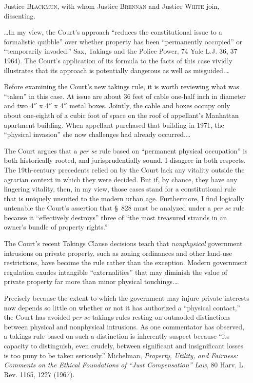 \opinion Justice \textsc{Blackmun}, with whom Justice \textsc{Brennan} and
Justice \textsc{White} join, dissenting.

\ldots In my view, the Court's approach ``reduces the constitutional issue to a
formalistic quibble'' over whether property has been ``permanently occupied'' or
``temporarily invaded.'' Sax, Takings and the Police Power, 74 Yale L.J. 36, 37
1964). The Court's application of its formula to the facts of this case vividly
illustrates that its approach is potentially dangerous as well as
misguided.\ldots

Before examining the Court's new takings rule, it is worth reviewing what was
``taken'' in this case. At issue are about 36 feet of cable one-half inch in
diameter and two 4$''$ x 4$''$ x 4$''$ metal boxes. Jointly, the cable
and boxes occupy only about one-eighth of a cubic foot of space on the roof of
appellant's Manhattan apartment building. When appellant purchased that building
in 1971, the ``physical invasion'' she now challenges had already
occurred.\ldots

The Court argues that a \textit{per se} rule based on ``permanent physical
occupation'' is both historically rooted, and jurisprudentially sound. I
disagree in both respects. The 19th-century precedents relied on by the Court
lack any vitality outside the agrarian context in which they were decided. But
if, by chance, they have any lingering vitality, then, in my view, those cases
stand for a constitutional rule that is uniquely unsuited to the modern urban
age. Furthermore, I find logically untenable the Court's assertion that \S~828
must be analyzed under a \textit{per se} rule because it ``effectively
destroys'' three of ``the most treasured strands in an owner's bundle of
property rights.''

The Court's recent Takings Clause decisions teach that \textit{nonphysical}
government intrusions on private property, such as zoning ordinances and other
land-use restrictions, have become the rule rather than the exception. Modern
government regulation exudes intangible ``externalities'' that may diminish the
value of private property far more than minor physical touchings.\ldots 

Precisely because the extent to which the government may injure private
interests now depends so little on whether or not it has authorized a ``physical
contact,'' the Court has avoided \textit{per se} takings rules resting on
outmoded distinctions between physical and nonphysical intrusions. As one
commentator has observed, a takings rule based on such a distinction is
inherently suspect because ``its capacity to distinguish, even crudely, between
significant and insignificant losses is too puny to be taken seriously.''
Michelman, \emph{Property, Utility, and Fairness: Comments on the Ethical
Foundations of ``Just Compensation'' Law}, 80 Harv. L. Rev. 1165, 1227 (1967).


